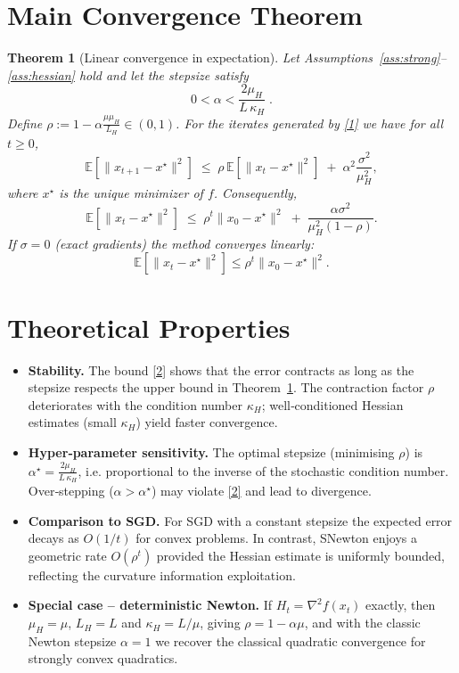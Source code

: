 \documentclass{article}
\newtheorem{theorem}{Theorem}
\newcommand{\E}{\mathbb{E}}
\begin{document}
\section*{Main Convergence Theorem}
\begin{theorem}[Linear convergence in expectation]\label{thm:linear}
Let Assumptions~\ref{ass:strong}–\ref{ass:hessian} hold and let the stepsize satisfy
\[
0<\alpha<\frac{2\mu_H}{L\,\kappa_H}\; .
\]
Define $\rho:=1-\alpha\frac{\mu\mu_H}{L_H}\in(0,1)$.  
For the iterates generated by \eqref{1} we have for all $t\ge0$,
\[
\E\!\left[\|x_{t+1}-x^{\star}\|^{2}\right]
\;\le\;
\rho\,\E\!\left[\|x_{t}-x^{\star}\|^{2}\right]
\;+\;
\alpha^{2}\frac{\sigma^{2}}{\mu_H^{2}},
\tag{2}
\]
where $x^{\star}$ is the unique minimizer of $f$.  
Consequently,
\[
\E\!\left[\|x_{t}-x^{\star}\|^{2}\right]
\;\le\;
\rho^{t}\|x_{0}-x^{\star}\|^{2}
\;+\;
\frac{\alpha\sigma^{2}}{\mu_H^{2}(1-\rho)} .
\tag{3}
\]
If $\sigma=0$ (exact gradients) the method converges linearly:
\[
\E\!\left[\|x_{t}-x^{\star}\|^{2}\right]\le \rho^{t}\|x_{0}-x^{\star}\|^{2}.
\]
\end{theorem}

\section*{Theoretical Properties}
\begin{itemize}
\item \textbf{Stability.} The bound \eqref{2} shows that the error contracts as long as the stepsize respects the upper bound in Theorem~\ref{thm:linear}. The contraction factor $\rho$ deteriorates with the condition number $\kappa_H$; well‑conditioned Hessian estimates (small $\kappa_H$) yield faster convergence.
\item \textbf{Hyper‑parameter sensitivity.} The optimal stepsize (minimising $\rho$) is $\alpha^{\star}= \frac{2\mu_H}{L\,\kappa_H}$, i.e. proportional to the inverse of the stochastic condition number. Over‑stepping ($\alpha>\alpha^{\star}$) may violate \eqref{2} and lead to divergence.
\item \textbf{Comparison to SGD.} For SGD with a constant stepsize the expected error decays as $O(1/t)$ for convex problems. In contrast, SNewton enjoys a geometric rate $O(\rho^{t})$ provided the Hessian estimate is uniformly bounded, reflecting the curvature information exploitation.
\item \textbf{Special case – deterministic Newton.} If $H_t=\nabla^{2}f(x_t)$ exactly, then $\mu_H=\mu$, $L_H=L$ and $\kappa_H=L/\mu$, giving $\rho=1-\alpha\mu$, and with the classic Newton stepsize $\alpha=1$ we recover the classical quadratic convergence for strongly convex quadratics.
\end{itemize}
\end{document}
